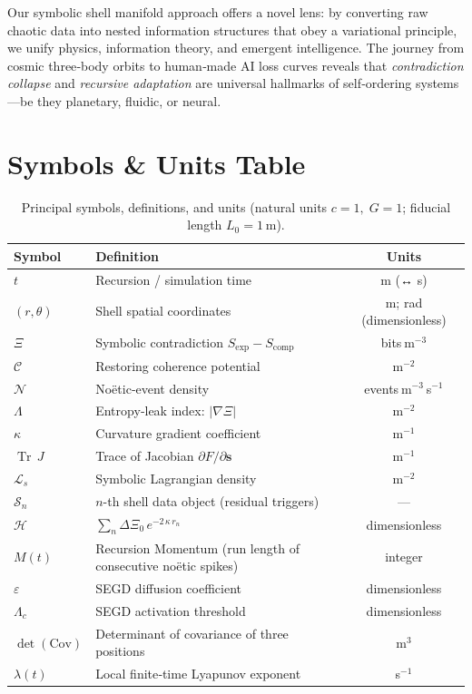 \documentclass[11pt]{article}
\newcommand{\Shell}{\mathcal{S}}
\newcommand{\Contradiction}{\Xi}
\newcommand{\Coherence}{\mathcal{C}}
\newcommand{\Noetic}{\mathcal{N}}
\newcommand{\Leak}{\Lambda}
\newcommand{\Curv}{\kappa}
\newcommand{\Lag}{\mathcal{L}_s}
\newcommand{\Hgain}{\mathcal{H}}
\newcommand{\TrJ}{\operatorname{Tr}\,J}
\begin{document}
Our symbolic shell manifold approach offers a novel lens: by converting raw chaotic data into nested information structures that obey a variational principle, we unify physics, information theory, and emergent intelligence. The journey from cosmic three‐body orbits to human‐made AI loss curves reveals that \emph{contradiction collapse} and \emph{recursive adaptation} are universal hallmarks of self‐ordering systems—be they planetary, fluidic, or neural.

\appendix

\section{Symbols \& Units Table}\label{app:symbols}
\begin{table}[H]
  \centering\small
  \caption{Principal symbols, definitions, and units (natural units \(c=1,\;G=1\); fiducial length \(L_0=1\) m).}
  \begin{tabularx}{\textwidth}{@{}lXc@{}}
  \toprule
  Symbol & Definition & Units \\ \midrule
  \(t\) & Recursion / simulation time & m (↔ s) \\
  \((r,\theta)\) & Shell spatial coordinates & m; rad (dimensionless) \\
  \(\Contradiction\) & Symbolic contradiction \(S_{\mathrm{exp}} - S_{\mathrm{comp}}\) & bits m\(^{-3}\) \\
  \(\Coherence\) & Restoring coherence potential & m\(^{-2}\) \\
  \(\Noetic\) & Noëtic‐event density & events m\(^{-3}\) s\(^{-1}\) \\
  \(\Leak\) & Entropy‐leak index: \(\lvert\nabla \Contradiction\rvert\) & m\(^{-2}\) \\
  \(\Curv\) & Curvature gradient coefficient & m\(^{-1}\) \\
  \(\TrJ\) & Trace of Jacobian \(\partial F / \partial \bm s\) & m\(^{-1}\) \\
  \(\Lag\) & Symbolic Lagrangian density & m\(^{-2}\) \\
  \(\Shell_{n}\) & \(n\)-th shell data object (residual triggers) & — \\
  \(\Hgain\) & \(\sum_n \Delta\Contradiction_0\,e^{-2\,\Curv\,r_n}\) & dimensionless \\
  \(M(t)\) & Recursion Momentum (run length of consecutive noëtic spikes) & integer \\
  \(\varepsilon\) & SEGD diffusion coefficient & dimensionless \\
  \(\Leak_c\) & SEGD activation threshold & dimensionless \\
  \(\det(\mathrm{Cov})\) & Determinant of covariance of three positions & m\(^{3}\) \\
  \(\lambda(t)\) & Local finite‐time Lyapunov exponent & s\(^{-1}\) \\
  \bottomrule
  \end{tabularx}
\end{table}
\end{document}

